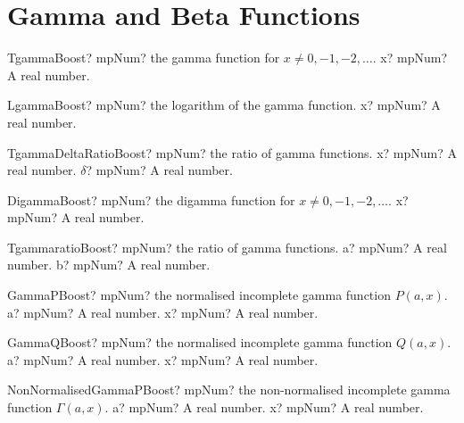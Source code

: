 \documentclass[12pt,a4paper,openany]{book}
\begin{document}
\section{Gamma and Beta Functions}

\begin{mpFunctionsExtract}
\mpFunctionOne
{TgammaBoost? mpNum? the gamma function for $x \neq 0, -1, -2,\ldots$.}
{x? mpNum? A real number.}
\end{mpFunctionsExtract}

\begin{mpFunctionsExtract}
\mpFunctionOne
{LgammaBoost? mpNum? the logarithm of the gamma function.}
{x? mpNum? A real number.}
\end{mpFunctionsExtract}

\begin{mpFunctionsExtract}
\mpFunctionTwo
{TgammaDeltaRatioBoost? mpNum?  the ratio of gamma functions.}
{x? mpNum? A real number.}
{$\delta$? mpNum? A real number.}
\end{mpFunctionsExtract}

\begin{mpFunctionsExtract}
\mpFunctionOne
{DigammaBoost? mpNum? the digamma function for $x \neq 0, -1, -2,\ldots$.}
{x? mpNum? A real number.}
\end{mpFunctionsExtract}

\begin{mpFunctionsExtract}
\mpFunctionTwo
{TgammaratioBoost? mpNum?  the ratio of gamma functions.}
{a? mpNum? A real number.}
{b? mpNum? A real number.}
\end{mpFunctionsExtract}

\begin{mpFunctionsExtract}
\mpFunctionTwo
{GammaPBoost? mpNum? the normalised incomplete gamma function $P(a,x)$.}
{a? mpNum? A real number.}
{x? mpNum? A real number.}
\end{mpFunctionsExtract}

\begin{mpFunctionsExtract}
\mpFunctionTwo
{GammaQBoost? mpNum? the normalised incomplete gamma function $Q(a,x)$.}
{a? mpNum? A real number.}
{x? mpNum? A real number.}
\end{mpFunctionsExtract}

\begin{mpFunctionsExtract}
\mpFunctionTwo
{NonNormalisedGammaPBoost? mpNum? the non-normalised incomplete gamma function $\Gamma(a,x)$.}
{a? mpNum? A real number.}
{x? mpNum? A real number.}
\end{mpFunctionsExtract}
\end{document}
